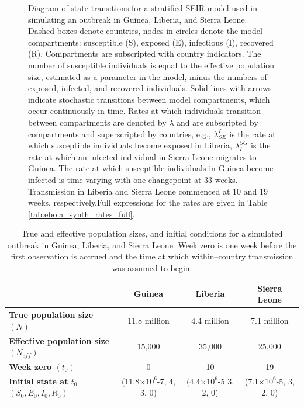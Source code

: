 \begin{figure}[htbp]
{
	}
	\caption[Diagram for a stratified SEIR model with country specific outbreak dynamics and cross--country transmission.]{Diagram of state transitions for a stratified SEIR model used in simulating an outbreak in Guinea, Liberia, and Sierra Leone. Dashed boxes denote countries, nodes in circles denote the model compartments: susceptible (S), exposed (E), infectious (I), recovered (R). Compartments  are subscripted with country indicators. The number of susceptible individuals is equal to the effective population size, estimated as a parameter in the model, minus the numbers of exposed, infected, and recovered individuals. Solid lines with arrows indicate stochastic transitions between model compartments, which occur continuously in time. Rates at which individuals transition between compartments are denoted by $ \lambda $ and are subscripted by compartments and superscripted by countries, e.g., $ \lambda_{SE}^L $ is the rate at which susceptible individuals become exposed in Liberia, $ \lambda_I^{SG} $ is the rate at which an infected individual in Sierra Leone migrates to Guinea. The rate at which susceptible individuals in Guinea become infected is time varying with one changepoint at 33 weeks. Transmission in Liberia and Sierra Leone commenced at 10 and 19 weeks, respectively.Full expressions for the rates are given in Table \ref{tab:ebola_synth_rates_full}.}
	\label{fig:stratified_seir_full_diag}
\end{figure}

\begin{table}[htbp]
	\caption[Week zero, and true and effective population sizes for a simulated Ebola outbreak in West Africa.]{True and effective population sizes, and initial conditions for a simulated outbreak in Guinea, Liberia, and Sierra Leone. Week zero is one week before the first observation is accrued and the time at which within--country transmission was assumed to begin. }
	\label{tab:ebola_synth_consts}
	\footnotesize
	\centering
	\begin{tabular}{lccc}	
		\hline	
		& \textbf{Guinea} & \textbf{Liberia} & \textbf{Sierra Leone} \\\hline
		\textbf{True population size $ (N)$} & 11.8 million & 4.4 million & 7.1 million \\ 
		\textbf{Effective population size $ (N_{eff}) $} & 15,000 & 35,000 & 25,000 \\
		\textbf{Week zero $ (t_0) $} & 0 & 10 & 19 \\
		\textbf{Initial state at $ t_0 $} $ (S_0,E_0,I_0,R_0) $ & (11.8$ \times 10^6$-7, 4, 3, 0) & (4.4$ \times 10^6$-5 3, 2, 0)& (7.1$ \times 10^6$-5, 3, 2, 0) \\
		\hline
		&&&
	\end{tabular} 
\end{table}


